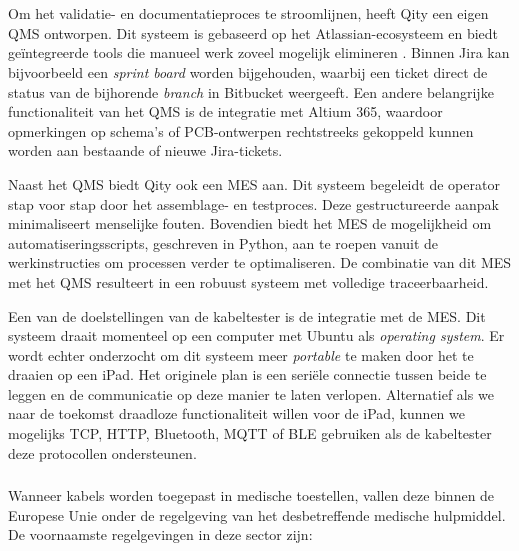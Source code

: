 \chapter{}%
\label{ch:conceptuele-oplossing}

\section{}%
\label{sec:QMS}
Om het validatie- en documentatieproces te stroomlijnen, heeft Qity een eigen \gls{QMS} ontworpen. Dit systeem is gebaseerd op het Atlassian-ecosysteem en biedt geïntegreerde tools die manueel werk zoveel mogelijk elimineren \autocite{Qity2025}. Binnen Jira kan bijvoorbeeld een \textit{sprint board} worden bijgehouden, waarbij een ticket direct de status van de bijhorende \textit{branch} in Bitbucket weergeeft. Een andere belangrijke functionaliteit van het \gls{QMS} is de integratie met Altium 365, waardoor opmerkingen op schema's of PCB-ontwerpen rechtstreeks gekoppeld kunnen worden aan bestaande of nieuwe Jira-tickets.

Naast het \gls{QMS} biedt Qity ook een \gls{MES} aan. Dit systeem begeleidt de operator stap voor stap door het assemblage- en testproces. Deze gestructureerde aanpak minimaliseert menselijke fouten. Bovendien biedt het \gls{MES} de mogelijkheid om automatiseringsscripts, geschreven in Python, aan te roepen vanuit de werkinstructies om processen verder te optimaliseren. De combinatie van dit \gls{MES} met het \gls{QMS} resulteert in een robuust systeem met volledige traceerbaarheid.

Een van de doelstellingen van de kabeltester is de integratie met de \gls{MES}. Dit systeem draait momenteel op een computer met Ubuntu als \textit{operating system}. Er wordt echter onderzocht om dit systeem meer \textit{portable} te maken door het te draaien op een iPad. Het originele plan is een seriële connectie tussen beide te leggen en de communicatie op deze manier te laten verlopen. Alternatief als we naar de toekomst draadloze functionaliteit willen voor de iPad, kunnen we mogelijks \acrshort{TCP}, \acrshort{HTTP}, Bluetooth, \gls{MQTT} of \gls{BLE} gebruiken als de kabeltester deze protocollen ondersteunen.

\subsection{}%
\label{ssec:regelgeving}
Wanneer kabels worden toegepast in medische toestellen, vallen deze binnen de Europese Unie onder de regelgeving van het desbetreffende medische hulpmiddel. De voornaamste regelgevingen in deze sector zijn:

